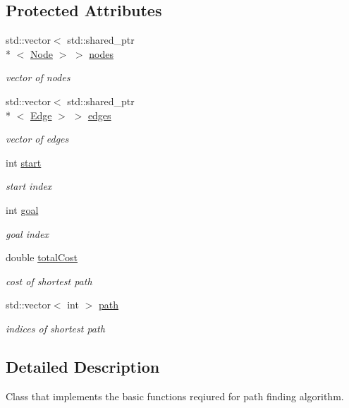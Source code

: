 \subsection*{Protected Attributes}
\begin{DoxyCompactItemize}
\item 
std\-::vector$<$ std\-::shared\-\_\-ptr\\*
$<$ \hyperlink{classNode}{Node} $>$ $>$ \hyperlink{classPathFindingAlgorithm_a131201eeaf50772259161b509007e0aa}{nodes}
\begin{DoxyCompactList}\small\item\em vector of nodes \end{DoxyCompactList}\item 
std\-::vector$<$ std\-::shared\-\_\-ptr\\*
$<$ \hyperlink{classEdge}{Edge} $>$ $>$ \hyperlink{classPathFindingAlgorithm_aa32be1db79cc1f557231ec2a583514bd}{edges}
\begin{DoxyCompactList}\small\item\em vector of edges \end{DoxyCompactList}\item 
int \hyperlink{classPathFindingAlgorithm_a1c31bd6b8c57459c32ada19cf9bf412a}{start}
\begin{DoxyCompactList}\small\item\em start index \end{DoxyCompactList}\item 
int \hyperlink{classPathFindingAlgorithm_ae8acf41f92ba72a969a44640c99fb8a4}{goal}
\begin{DoxyCompactList}\small\item\em goal index \end{DoxyCompactList}\item 
double \hyperlink{classPathFindingAlgorithm_ad6a91f82618d6a7a95900b5c63337837}{total\-Cost}
\begin{DoxyCompactList}\small\item\em cost of shortest path \end{DoxyCompactList}\item 
std\-::vector$<$ int $>$ \hyperlink{classPathFindingAlgorithm_ab177b2276cdf28fb77361bff19745b17}{path}
\begin{DoxyCompactList}\small\item\em indices of shortest path \end{DoxyCompactList}\end{DoxyCompactItemize}


\subsection{Detailed Description}
Class that implements the basic functions reqiured for path finding algorithm. 

